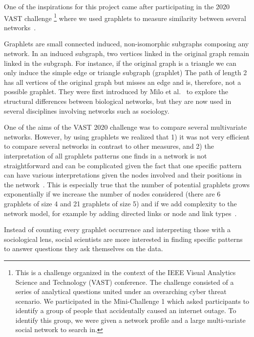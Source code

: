 One of the inspirations for this project came after participating in the 2020 VAST challenge \footnote{This is a challenge organized in the context of the IEEE Visual Analytics Science and Technology (VAST) conference. The challenge consisted of a series of analytical questions united under an overarching cyber threat scenario. We participated in the Mini-Challenge 1 which asked participants to identify a group of people that accidentally caused an internet outage. To identify this group, we were given a network profile and a large multi-variate social network to search in.} where we used graphlets to measure similarity between several networks~\cite{tovanichVAST2020Contest2021}.

Graphlets are small connected induced, non-isomorphic subgraphs composing any network.
In an induced subgraph, two vertices linked in the original graph remain linked in the subgraph.
For instance, if the original graph is a triangle we can only induce the simple edge or triangle subgraph (graphlet)
The path of length 2 has all vertices of the original graph but misses an edge and is, therefore, not a possible graphlet.
They were first introduced by Milo et al.~\cite{miloNetworkMotifsSimple2002} to explore the structural differences between biological networks, but they are now used in several disciplines involving networks such as sociology.

One of the aims of the VAST 2020 challenge was to compare several multivariate networks.
However, by using graphlets we realized that 1) it was not very efficient to compare several networks in contrast to other measures, and 2) the interpretation of all graphlets patterns one finds in a network is not straightforward and can be complicated given the fact that one specific pattern can have various interpretations given the nodes involved and their positions in the network~\cite{ingramNetworkMotifsStructure2006}.
This is especially true that the number of potential graphlets grows exponentially if we increase the number of nodes considered (there are 6 graphlets of size 4 and 21 graphlets of size 5) and if we add complexity to the network model, for example by adding directed links or node and link types~\cite{ribeiroDiscoveringColoredNetwork2014}.

Instead of counting every graphlet occurrence and interpreting those with a sociological lens, social scientists are more interested in finding specific patterns to answer questions they ask themselves on the data.




